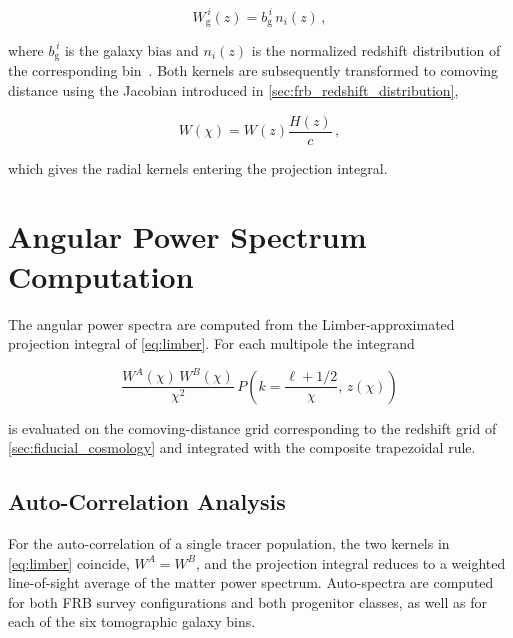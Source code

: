 \begin{equation}\label{eq:weight_galaxy}
    W_{\mathrm{g}}^{\,i}(z) = b_{\mathrm{g}}^{\,i} \, n_i(z) \,,
\end{equation}

where $b_{\mathrm{g}}^{\,i}$ is the galaxy bias and $n_i(z)$ is the normalized redshift
distribution of the corresponding bin~\cite{Muir_2020}.
Both kernels are subsequently transformed to comoving distance using the Jacobian introduced in \autoref{sec:frb_redshift_distribution},

\begin{equation}\label{eq:weight_chi}
    W(\chi) = W(z) \frac{H(z)}{c} \,,
\end{equation}

which gives the radial kernels entering the projection integral.

\section{Angular Power Spectrum Computation} \label{sec:angular_power_spectra}
The angular power spectra are computed from the Limber-approximated projection integral of
\autoref{eq:limber}.
For each multipole the integrand

\begin{equation}
    \frac{W^{A}(\chi)\,W^{B}(\chi)}{\chi^2}\,
    P\!\left(k = \frac{\ell+1/2}{\chi},\, z(\chi)\right)
\end{equation}

is evaluated on the comoving-distance grid corresponding to the redshift grid of
\autoref{sec:fiducial_cosmology} and integrated with the composite trapezoidal rule. 

\subsection{Auto-Correlation Analysis} \label{sec:auto_correlation_analysis}
For the auto-correlation of a single tracer population, the two kernels in \autoref{eq:limber}
coincide, $W^A = W^B$, and the projection integral reduces to a weighted line-of-sight average of
the matter power spectrum. Auto-spectra are computed for both FRB survey configurations and both
progenitor classes, as well as for each of the six tomographic galaxy bins.

